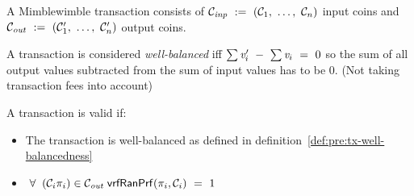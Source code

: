 A Mimblewimble transaction consists of $\mathcal{C}_{\mathit{inp}} ~:=~ (\mathcal{C}_1 ,~ \dots ,~ \mathcal{C}_n)$ input coins and $\mathcal{C}_{\mathit{out}} ~:=~ (\mathcal{C}'_1 ,~ \dots ,~ \mathcal{C}'_n)$ output coins.
\begin{definition}  \label{def:pre:tx-well-balancedness}
    A transaction is considered \emph{well-balanced} iff $\sum{\mathit{v}'_i} ~-~ \sum{\mathit{v}_i} ~=~ 0$ so the sum of all output values subtracted from the sum of input values has to be 0. (Not taking transaction fees into account)
\end{definition}

\begin{definition} \label{def:pre:tx-mw-validity}
    A transaction is valid if:
    \begin{itemize}
        \item The transaction is well-balanced as defined in definition~\ref{def:pre:tx-well-balancedness}
        \item $\;\forall\; \; (\mathcal{C}_i \pi_i) \in \mathcal{C}_{\mathit{out}} \; \mathsf{vrfRanPrf}(\pi_i,\mathcal{C}_i) ~=~ 1$
    \end{itemize}
\end{definition}


